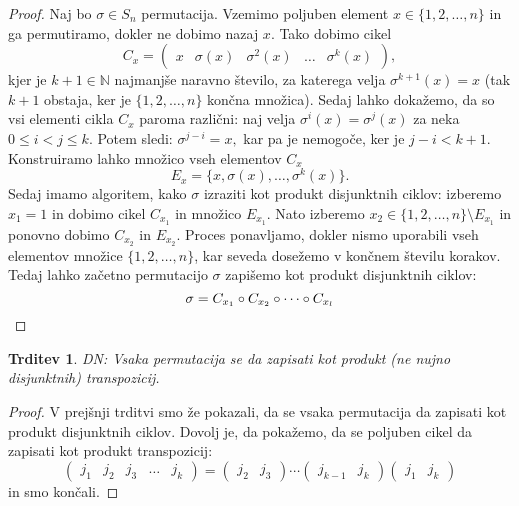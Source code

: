 \documentclass[10pt, a4paper]{article}
\newtheorem{trditev}[izr]{Trditev}
\newenvironment{noticeC}{%
  \tcolorbox[%
  notitle,
  empty,
  enhanced,  %
  breakable,
  coltext=black, 
  fontupper=\rmfamily,
  parbox=false,
  noparskip,
  sharp corners,
  boxrule=-1pt,  %
  frame hidden,
  left=7pt,  %
  right=7pt,
  top=5pt,
  bottom=5pt,
  before skip=2.5ex plus 2pt,
  after skip=2.5ex plus 2pt,
  overlay unbroken and last={%
  },
  ]}
{\endtcolorbox}
\newenvironment{dokaz}%
  {\begin{noticeC}\begin{proof}}%
  {\end{proof}\end{noticeC}}
\newcommand{\N}{\mathbb {N}}
\begin{document}
\begin{dokaz}
    Naj bo $\sigma \in S_n$ permutacija. Vzemimo poljuben element $x \in \{1, 2, \dots, n\}$ in ga permutiramo, dokler ne dobimo nazaj $x$. Tako dobimo cikel
    $$C_x = \begin{pmatrix}
        x & \sigma (x) & \sigma^2(x) & \dots & \sigma^k (x)
    \end{pmatrix},$$
    kjer je $k+1 \in \N$ najmanjše naravno število, za katerega velja $\sigma^{k+1} (x) = x$ (tak $k+1$ obstaja, ker je $\{1, 2, \dots, n\}$ končna množica).
    Sedaj lahko dokažemo, da so vsi elementi cikla $C_x$ paroma različni:
    naj velja $\sigma^i(x) = \sigma^j(x)$ za neka $0 \leq i < j \leq k$. Potem sledi:
    $\sigma^{j-i} = x,$ kar pa je nemogoče, ker je $j-i < k+1$.
    Konstruiramo lahko množico vseh elementov $C_x$
    $$E_x = \{x, \sigma(x), \dots, \sigma^{k} (x)\}.$$
    Sedaj imamo algoritem, kako $\sigma$ izraziti kot produkt disjunktnih ciklov:
    izberemo $x_1 = 1$ in dobimo cikel $C_{x_1}$ in množico $E_{x_1}$.
    Nato izberemo $x_2 \in \{1,2, \dots, n\} \setminus E_{x_1}$ in ponovno dobimo $C_{x_2}$ in $E_{x_2}$. Proces ponavljamo, dokler nismo uporabili vseh elementov množice $\{1,2, \dots, n\}$, kar seveda dosežemo v končnem številu korakov.
    Tedaj lahko začetno permutacijo $\sigma$ zapišemo kot produkt disjunktnih ciklov:
    \begin{equation*}
        \sigma = C_{x_1} \circ C_{x_2} \circ \cdots \circ C_{x_l} \qedhere
    \end{equation*}
\end{dokaz}

\begin{trditev}
    DN: Vsaka permutacija se da zapisati kot produkt (ne nujno disjunktnih) transpozicij.
\end{trditev}

\begin{dokaz}
    V prejšnji trditvi smo že pokazali, da se vsaka permutacija da zapisati kot produkt disjunktnih ciklov. Dovolj je, da pokažemo, da se poljuben cikel da zapisati kot produkt transpozicij:
    $$\begin{pmatrix}
        j_1 & j_2 & j_3 & \dots & j_k
    \end{pmatrix} = \begin{pmatrix}
        j_2 & j_3
    \end{pmatrix} \cdots \begin{pmatrix}
        j_{k-1} & j_k
    \end{pmatrix} \begin{pmatrix}
        j_1 & j_k
    \end{pmatrix}$$
    in smo končali.
\end{dokaz}
\end{document}
